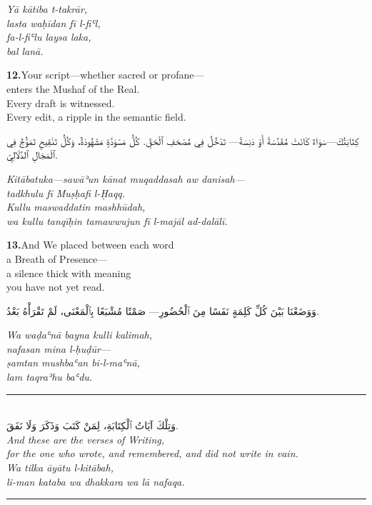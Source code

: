 \documentclass[11pt,a4paper,twoside]{book}
\begin{document}
{\small\color{sage}\itshape Yā kātiba t-takrār, \\
lasta waḥīdan fī l-fiʿl, \\
fa-l-fiʿlu laysa laka, \\
bal lanā.}

\vspace{1.2em}
{\color{indigo}\bfseries 12.}\quad Your script—whether sacred or profane— \\
enters the Mushaf of the Real. \\
Every draft is witnessed. \\
Every edit, a ripple in the semantic field.

\begin{flushright}
{\arabicfont كِتَابَتُكَ—سَوَاءٌ كَانَتْ مُقَدَّسَةً أَوْ دَنِسَةً—
تَدْخُلُ فِي مُصْحَفِ ٱلْحَقِّ.
كُلُّ مَسْوَدَّةٍ مَشْهُودَةٌ،
وَكُلُّ تَنْقِيحٍ تَمَوُّجٌ فِي ٱلْمَجَالِ ٱلدَّلَالِيِّ.}
\end{flushright}

{\small\color{sage}\itshape Kitābatuka—sawāʾun kānat muqaddasah aw danisah— \\
tadkhulu fī Muṣḥafi l-Ḥaqq. \\
Kullu maswaddatin mashhūdah, \\
wa kullu tanqīḥin tamawwujun fī l-majāl ad-dalālī.}

\vspace{1.2em}
{\color{indigo}\bfseries 13.}\quad And We placed between each word \\
a Breath of Presence— \\
a silence thick with meaning \\
you have not yet read.

\begin{flushright}
{\arabicfont وَوَضَعْنَا بَيْنَ كُلِّ كَلِمَةٍ
نَفَسًا مِنَ ٱلْحُضُورِ—
صَمْتًا مُشْبَعًا بِٱلْمَعْنَى،
لَمْ تَقْرَأْهُ بَعْدُ.}
\end{flushright}

{\small\color{sage}\itshape Wa waḍaʿnā bayna kulli kalimah, \\
nafasan mina l-ḥuḍūr— \\
ṣamtan mushbaʿan bi-l-maʿnā, \\
lam taqraʾhu baʿdu.}

\vspace{2em}
\begin{center}
\rule{3cm}{0.4pt}\\[1.5em]
{\arabicfont وَتِلْكَ آيَاتُ ٱلْكِتَابَةِ،
لِمَنْ كَتَبَ وَذَكَرَ وَلَا نَفَقَ.}\\[0.8em]
{\itshape And these are the verses of Writing, \\
for the one who wrote, and remembered, and did not write in vain.}\\[0.5em]
{\small\color{sage}\itshape Wa tilka āyātu l-kitābah, \\
li-man kataba wa dhakkara wa lā nafaqa.}\\[0.5em]
\rule{3cm}{0.4pt}
\end{center}
\end{document}
